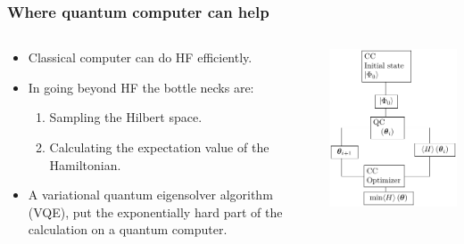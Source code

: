 \documentclass{beamer}
\renewcommand{\(}{\left(}
\renewcommand{\)}{\right)}
\renewcommand{\[}{\left[}
\renewcommand{\]}{\right]}
\begin{document}
\begin{frame}
    \frametitle{Where quantum computer can help}
    \begin{columns}
        \begin{column}[]{0.5\textwidth}
            \begin{itemize}
                \item Classical computer can do HF efficiently.
                \item In going beyond HF the bottle necks are: \begin{enumerate}
                    \item Sampling the Hilbert space. 
                    \item Calculating the expectation value of the Hamiltonian. \pause
                \end{enumerate}  
                \item A variational quantum eigensolver algorithm (VQE), put the exponentially hard part of the calculation on a quantum computer. 
            \end{itemize}
        \end{column}
        \begin{column}[]{0.5\textwidth}
            \begin{center}
                \includegraphics[scale=0.93]{VQE_flow_chart.pdf}
            \end{center}
        \end{column}
    \end{columns}
   
\end{frame}
\end{document}
